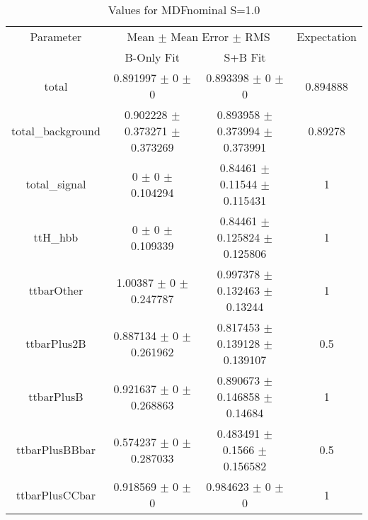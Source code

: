 \begin{table}
\centering
\caption{Values for MDFnominal S=1.0}
\begin{tabular}{cccc}
\toprule
Parameter & \multicolumn{2}{c}{Mean $\pm$ Mean Error $\pm$ RMS} & Expectation\\
 & B-Only Fit & S+B Fit & \\
\midrule
total & \num{0.891997} $\pm$ \num{0} $\pm$ \num{0} & \num{0.893398} $\pm$ \num{0} $\pm$ \num{0} & \num{0.894888}\\
total\_background & \num{0.902228} $\pm$ \num{0.373271} $\pm$ \num{0.373269} & \num{0.893958} $\pm$ \num{0.373994} $\pm$ \num{0.373991} & \num{0.89278}\\
total\_signal & \num{0} $\pm$ \num{0} $\pm$ \num{0.104294} & \num{0.84461} $\pm$ \num{0.11544} $\pm$ \num{0.115431} & \num{1}\\
ttH\_hbb & \num{0} $\pm$ \num{0} $\pm$ \num{0.109339} & \num{0.84461} $\pm$ \num{0.125824} $\pm$ \num{0.125806} & \num{1}\\
ttbarOther & \num{1.00387} $\pm$ \num{0} $\pm$ \num{0.247787} & \num{0.997378} $\pm$ \num{0.132463} $\pm$ \num{0.13244} & \num{1}\\
ttbarPlus2B & \num{0.887134} $\pm$ \num{0} $\pm$ \num{0.261962} & \num{0.817453} $\pm$ \num{0.139128} $\pm$ \num{0.139107} & \num{0.5}\\
ttbarPlusB & \num{0.921637} $\pm$ \num{0} $\pm$ \num{0.268863} & \num{0.890673} $\pm$ \num{0.146858} $\pm$ \num{0.14684} & \num{1}\\
ttbarPlusBBbar & \num{0.574237} $\pm$ \num{0} $\pm$ \num{0.287033} & \num{0.483491} $\pm$ \num{0.1566} $\pm$ \num{0.156582} & \num{0.5}\\
ttbarPlusCCbar & \num{0.918569} $\pm$ \num{0} $\pm$ \num{0} & \num{0.984623} $\pm$ \num{0} $\pm$ \num{0} & \num{1}\\
\bottomrule
\end{tabular}
\end{table}